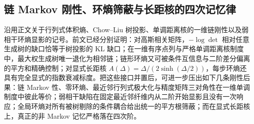 \subsection{链 Markov 刚性、环熵筛蔽与长距核的四次记忆律}\label{subsec:conclusion-chain-markov-loop-memory-rigidity}
沿用正文关于行列式体积熵、Chow--Liu 树投影、单调距离核的一维链刚性以及弱相干环熵显影的记号。前文已经分别证明：对高斯相关矩阵，\(-\log\det\) 相对任意生成树的缺口恰等于树投影的 KL 缺口；在一维有序点列与严格单调距离核制度中，最大权生成树唯一退化为相邻链；链形环熵又可被条件互信息与二阶差分偏离的平方和精确控制；对显式长距核 \(A(\Delta)=\Delta/(2\sinh(\Delta/2))\)，每步环熵还具有完全显式的指数衰减标度。把这些接口并置后，可进一步压出如下几条刚性后果：链 Markov 性、零环熵、最近邻行列式极大化与精度矩阵三对角性在一维单调制度中彼此等价；弱相干缺陷在固定最近邻纤维内从二阶开始显影且没有一次响应；全局环熵对所有被树剔除的条件耦合给出统一的平方根筛蔽；而在显式长距核上，真正的非 Markov 记忆严格落在四次阶。

